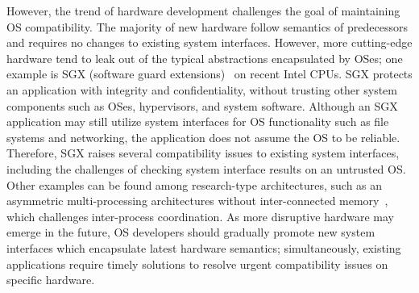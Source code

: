 However, the trend of hardware development
challenges the goal of maintaining OS compatibility.
The majority of new hardware follow semantics of predecessors
and requires no changes to existing system interfaces.
However, more cutting-edge hardware tend to leak out of
the typical abstractions
encapsulated by OSes;
one example is SGX (software guard extensions)~\cite{intelsgx}
on recent Intel CPUs.
SGX protects an application
with integrity and confidentiality, without trusting other system components 
such as OSes, hypervisors, and system software.
Although an SGX application
may still utilize system interfaces for OS functionality
such as file systems and networking, the application does not assume
the OS to be reliable.
Therefore, SGX raises several compatibility issues to
existing system interfaces,
including the challenges of checking system interface results
on an untrusted OS.
Other examples can be found among research-type architectures,
such as an asymmetric multi-processing architectures
without inter-connected memory~\cite{gschwind2007,cascaval2002evaluation},
which challenges inter-process coordination.
As more disruptive hardware
may emerge in the future, OS developers should
gradually promote new system interfaces which encapsulate latest hardware semantics; simultaneously, existing applications require timely solutions to resolve urgent compatibility issues on specific hardware.


